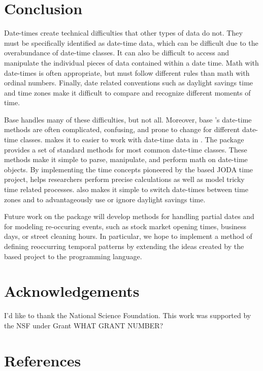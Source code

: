 \documentclass[article]{jss}
\begin{document}
\section{Conclusion}
Date-times create technical difficulties that other types of data do not. They must be specifically identified as date-time data, which can be difficult due to the overabundance of date-time classes. It can also be difficult to access and manipulate the individual pieces of data contained within a date time. Math with date-times is often appropriate, but must follow different rules than math with ordinal numbers. Finally, date related conventions such as daylight savings time and time zones make it difficult to compare and recognize different moments of time.

Base  handles many of these difficulties, but not all. Moreover, base 's date-time methods are often complicated, confusing, and prone to change for different date-time classes.  makes it to easier to work with date-time data in . The package provides a set of standard methods for most common date-time classes. These methods make it simple to parse, manipulate, and perform math on date-time objects. By implementing the time concepts pioneered by the  based JODA time project,  helps researchers perform precise calculations as well as model tricky time related processes.  also makes it simple to switch date-times between time zones and to advantageously use or ignore daylight savings time.

Future work on the  package will develop methods for handling partial dates and for modeling re-occuring events, such as stock market opening times, business days, or street cleaning hours. In particular, we hope to implement a method of defining reoccurring temporal patterns by extending the ideas created by the  based  project to the  programming language.

\section*{Acknowledgements}
I'd like to thank the National Science Foundation. This work was supported by the NSF under Grant WHAT GRANT NUMBER? 

\section*{References}
\end{document}
